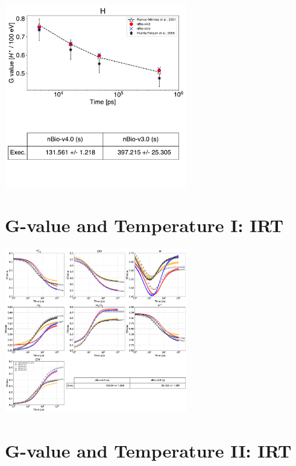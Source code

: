 \documentclass[aspectratio=1610]{beamer}
\begin{document}
\begin{frame}{\secname}
 \centering
  \includegraphics[width=0.6\textwidth]{./GvalueIRT_H/TimeEvolution}
\end{frame}


\section{G-value and Temperature I: IRT}

\begin{frame}{\secname}
 \centering
  \includegraphics[width=0.6\textwidth]{./GvalueIRT-Temperature/TimeEvolution}

\end{frame}

\section{G-value and Temperature II: IRT}
\end{document}
